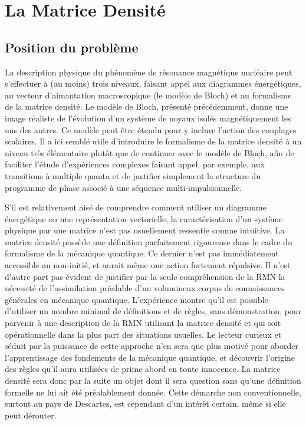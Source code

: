 \chapter[La Matrice Densité]{La Matrice Densité}
\label{chap:densite}

\section{Position du problème}
La description physique du phénomène de résonance magnétique nucléaire
peut s'effectuer à (au moins) trois niveaux, faisant appel aux diagrammes énergétiques,
au vecteur d'aimantation macroscopique (le modèle de Bloch) et au formalisme
de la matrice densité.
Le modèle de Bloch, présenté précédemment, donne une image réaliste de 
l'évolution d'un système de noyaux isolés magnétiquement les uns des autres. 
Ce modèle peut être étendu pour y inclure l'action
des couplages scalaires. 
Il a ici semblé utile d'introduire le formalisme de la matrice densité à un 
niveau très élémentaire plutôt que de continuer avec le modèle de Bloch,
afin de faciliter l'étude d'expériences complexes 
faisant appel, par exemple, aux transitions à multiple quanta et
de justifier simplement la structure du programme de phase associé à une séquence 
multi-impulsionnelle. 

S'il est relativement aisé de comprendre comment utiliser
un diagramme énergétique ou une représentation vectorielle,
la caractérisation d'un système physique par une matrice
n'est pas usuellement ressentie comme intuitive.
La matrice densité possède une définition parfaitement rigoureuse dans 
le cadre du formalisme de la mécanique quantique.
Ce dernier n'est pas immédiatement accessible au non-initié,
et aurait même une action fortement répulsive.
Il n'est d'autre part pas évident de justifier 
par la seule compréhension de la RMN
la nécessité de l'assimilation préalable d'un volumineux
corpus de connaissances générales en mécanique quantique.
L'expérience montre qu'il est possible d'utiliser un nombre minimal
de définitions et de règles, sans démonstration, pour parvenir à une
description de la RMN utilisant la matrice densité et
qui soit opérationnelle dans la plus part des situations usuelles.
Le lecteur curieux et séduit par la puissance de cette approche n'en sera que
plus motivé pour aborder l'apprentissage des fondements de la mécanique quantique,
et découvrir l'origine des règles qu'il aura utilisées de prime
abord en toute innocence.
La matrice densité sera donc par la suite un objet dont il sera question
sans qu'une définition formelle ne lui ait été préalablement donnée.
Cette démarche non conventionnelle, surtout au pays de Descartes,
est cependant d'un intérêt certain, même
si elle peut dérouter.


